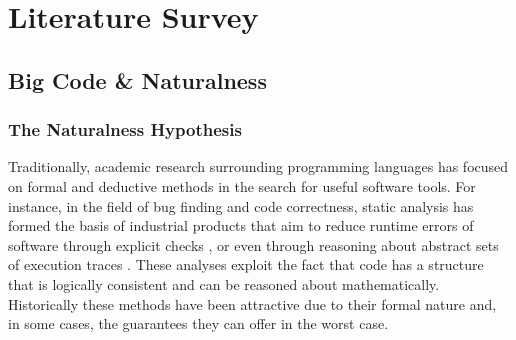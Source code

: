 \chapter{Literature Survey}
\label{literature_survey}


\section{Big Code \& Naturalness} %

\subsection{The Naturalness Hypothesis} %
\label{ssub:the_naturalness_hypothesis}

Traditionally, academic research surrounding programming languages has focused on formal and deductive methods in the search for useful software tools.
For instance, in the field of bug finding and code correctness, static analysis has formed the basis of industrial products that aim to reduce runtime errors of software through explicit checks \cite{okada_combination_2007}, or even through reasoning about abstract sets of execution traces
\cite{bessey_few_2010}. 
These analyses exploit the fact that code has a structure that is logically consistent and can be reasoned about mathematically.
Historically these methods have been attractive due to their formal nature and, in some cases, the guarantees they can offer in the worst case.



